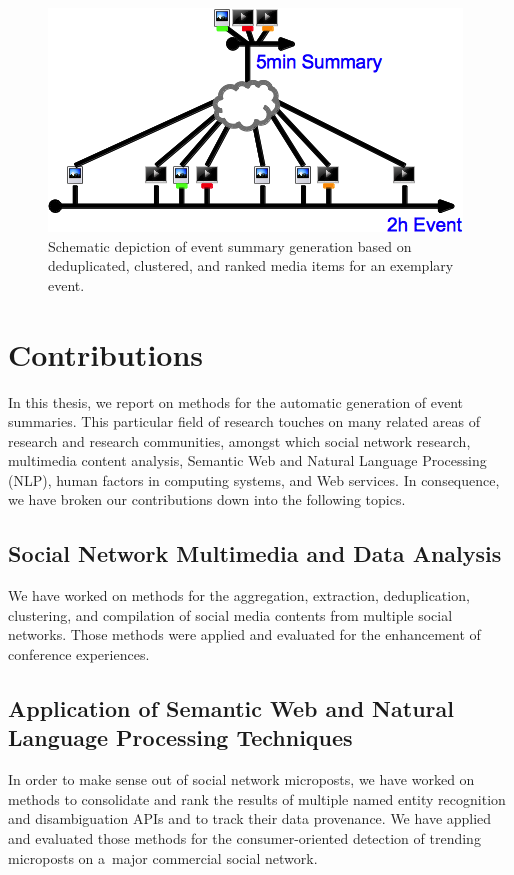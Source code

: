 \begin{figure}[h!]
  \centering
  \includegraphics[]{thesis-diagram.png}
  \caption{Schematic depiction of event summary generation
    based on deduplicated, clustered, and ranked media items
    for an exemplary event.}
  \label{fig:thesis-diagram}
\end{figure}

\section{Contributions}

In this thesis, we report on methods for
the automatic generation of event summaries.
This particular field of research touches on many related areas
of research and research communities,
amongst which social network research, multimedia content analysis,
Semantic Web and Natural Language Processing (NLP),
human factors in computing systems,
and Web services.
In consequence, we have broken our contributions down into
the following topics.

\subsection{Social Network Multimedia and Data Analysis}

We have worked on methods for the aggregation, extraction,
deduplication, clustering, and compilation
of social media contents from
multiple social networks.
Those methods were applied and evaluated
for the enhancement of conference experiences.

\subsection{Application of Semantic Web and Natural Language Processing Techniques}

In order to make sense out of social network microposts,
we have worked on methods to consolidate and rank
the results of multiple named entity recognition and
disambiguation APIs and to track their data provenance.
We have applied and evaluated those methods
for the consumer-oriented detection of trending microposts
on a~major commercial social network.

